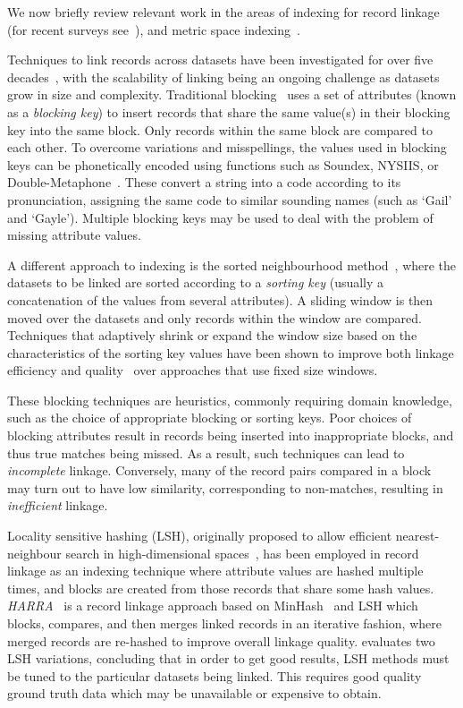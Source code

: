 \documentclass{llncs}
\begin{document}
We now briefly review relevant work in the areas of indexing for record
linkage (for recent surveys see~\cite{Chr12b,Pap16}), and metric space
indexing~\cite{Zezula2010}.

Techniques to link records across datasets have been investigated for
over five decades~\cite{Fel69,New59}, with the scalability of linking
being an ongoing challenge as datasets grow in size and complexity.
Traditional blocking~\cite{Chr12b} uses a set of attributes (known as a
\emph{blocking key}) to insert records that share the same value(s) in
their blocking key into the same block. Only records within the same
block are  compared to each other. To overcome variations and
misspellings, the values used in blocking keys can be phonetically
encoded using functions such as Soundex, NYSIIS, or
Double-Metaphone~\cite{Chr12}. These convert a string into a code
according to its pronunciation, assigning the same code to similar
sounding names (such as `Gail' and `Gayle'). Multiple blocking keys
may be used to deal with the problem of missing attribute values.

A different approach to indexing is the sorted neighbourhood
method~\cite{Mon96}, where the datasets to be linked are sorted
according to a \emph{sorting key} (usually a concatenation of the values
from several attributes). A sliding window is then moved over the
datasets and only records within the window are compared. Techniques
that adaptively shrink or expand the window size based on the
characteristics of the sorting key values have been shown to improve both
linkage efficiency and quality~\cite{Dra12} over
approaches that use fixed size windows.

These blocking techniques are heuristics, commonly requiring domain
knowledge, such as the choice of appropriate blocking or sorting keys.
Poor choices of blocking attributes result in records being inserted
into inappropriate blocks, and thus true matches being missed. As a
result, such techniques can lead to \emph{incomplete} linkage.
Conversely, many of the record pairs compared in a block may turn
out to have low similarity, corresponding to non-matches, resulting in
\emph{inefficient} linkage.

Locality sensitive hashing (LSH), originally proposed to allow efficient
nearest-neighbour search in high-dimensional spaces~\cite{Ind98}, has
been employed in record linkage as an indexing technique where attribute
values are hashed multiple times, and blocks are created from those
records that share some hash values. \emph{HARRA}~\cite{Kim10} is a
record linkage approach based on MinHash~\cite{Broder1997} and LSH
which blocks, compares, and then merges linked records in an iterative
fashion, where merged records are re-hashed to improve overall linkage
quality. \cite{Steorts2014} evaluates two LSH variations, concluding
that in order to get good results, LSH methods must be tuned to the
particular datasets being linked. This requires good quality ground
truth data which may be unavailable or expensive to obtain.
\end{document}
